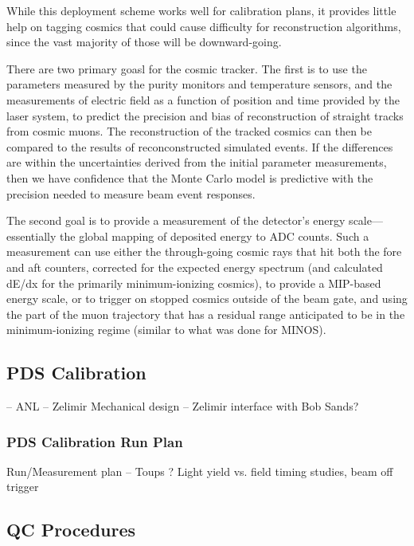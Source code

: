 	While this deployment scheme works well for calibration plans, it
provides little help on tagging cosmics that could cause difficulty for
reconstruction algorithms, since the vast majority of those will be
downward-going.  

	There are two primary goasl for the cosmic tracker. The first is to use
the parameters measured by the purity monitors and temperature sensors, and the
measurements of electric field as a function of position and time provided by
the laser system, to predict the precision and bias of reconstruction of
straight tracks from cosmic muons. The reconstruction of the tracked cosmics
can then be compared to the results of reconconstructed simulated events. If
the differences are within the uncertainties derived from the initial parameter
measurements, then we have confidence that the Monte Carlo model is predictive
with the precision needed to measure beam event responses.  

	The second goal is to provide a measurement of the detector's energy
scale---essentially the global mapping of deposited energy to ADC counts.  Such
a measurement can use either the through-going cosmic rays that hit both the
fore and aft counters, corrected for the expected energy spectrum (and
calculated dE/dx for the primarily minimum-ionizing cosmics), to provide a
MIP-based energy scale, or to trigger on stopped cosmics outside of the beam
gate, and using the part of the muon trajectory that has a residual range
anticipated to be in the minimum-ionizing regime (similar to what was done for
MINOS).  
	

\subsection{PDS Calibration} -- ANL -- Zelimir
     Mechanical design -- Zelimir interface with Bob Sands?

\subsubsection{PDS Calibration Run Plan}
     Run/Measurement plan  -- Toups ?
     Light yield vs. field
     timing studies,
     beam off trigger

\subsection{QC Procedures}

